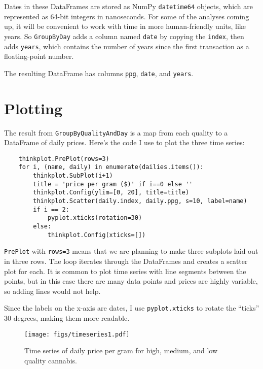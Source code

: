 \documentclass[12pt]{book}
\begin{document}
Dates in these DataFrames are stored as NumPy {\tt datetime64}
objects, which are represented as 64-bit integers in nanoseconds.
For some of the analyses coming up, it will be convenient to
work with time in more human-friendly units, like years.  So
{\tt GroupByDay} adds a column named {\tt date} by copying
the {\tt index}, then adds {\tt years}, which contains the number
of years since the first transaction as a floating-point number.

The resulting DataFrame has columns {\tt ppg}, {\tt date}, and
{\tt years}.


\section{Plotting}

The result from {\tt GroupByQualityAndDay} is a map from each quality
to a DataFrame of daily prices.  Here's the code I use to plot
the three time series:

\begin{verbatim}
    thinkplot.PrePlot(rows=3)
    for i, (name, daily) in enumerate(dailies.items()):
        thinkplot.SubPlot(i+1)
        title = 'price per gram ($)' if i==0 else ''
        thinkplot.Config(ylim=[0, 20], title=title)
        thinkplot.Scatter(daily.index, daily.ppg, s=10, label=name)
        if i == 2: 
            pyplot.xticks(rotation=30)
        else:
            thinkplot.Config(xticks=[])
\end{verbatim}

{\tt PrePlot} with {\tt rows=3} means that we are planning to
make three subplots laid out in three rows.  The loop iterates
through the DataFrames and creates a scatter plot for each.  It is
common to plot time series with line segments between the points,
but in this case there are many data points and prices are highly
variable, so adding lines would not help.

Since the labels on the x-axis are dates, I use {\tt pyplot.xticks}
to rotate the ``ticks'' 30 degrees, making them more readable.

\begin{figure}
\centerline{\texttt{[image: figs/timeseries1.pdf]}}
\caption{Time series of daily price per gram for high, medium, and low
quality cannabis.}
\label{timeseries1}
\end{figure}
\end{document}
